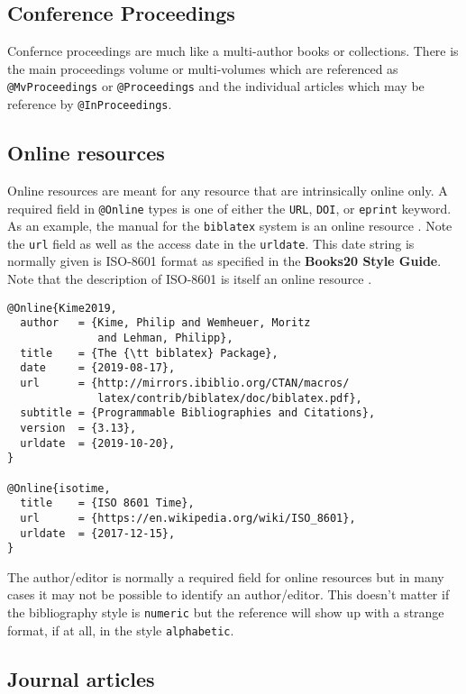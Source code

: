 \subsection{Conference Proceedings}

Confernce proceedings are much like a multi-author books or
collections.  There is the main proceedings volume or multi-volumes
which are referenced as \texttt{@MvProceedings} or
\texttt{@Proceedings} and the individual articles which may be
reference by \texttt{@InProceedings}.

\subsection{Online resources}

Online resources are meant for any resource that are intrinsically
online only.  A required field in \texttt{@Online} types is one of
either the \texttt{URL}, \texttt{DOI}, or \texttt{eprint}
keyword. As an example, the manual for the \texttt{biblatex} system
is an online resource \cite{Kime2019}. Note the \texttt{url} field
as well as the access date in the \texttt{urldate}. This date
string is normally given is ISO-8601 format as specified in the
{\bfseries Books20 Style Guide}. Note that the description of ISO-8601
is itself an online resource \cite{isotime}.

\begin{verbatim}
@Online{Kime2019,
  author   = {Kime, Philip and Wemheuer, Moritz
              and Lehman, Philipp},
  title    = {The {\tt biblatex} Package},
  date     = {2019-08-17},
  url      = {http://mirrors.ibiblio.org/CTAN/macros/
              latex/contrib/biblatex/doc/biblatex.pdf},
  subtitle = {Programmable Bibliographies and Citations},
  version  = {3.13},
  urldate  = {2019-10-20},
}

@Online{isotime,
  title    = {ISO 8601 Time},
  url      = {https://en.wikipedia.org/wiki/ISO_8601},
  urldate  = {2017-12-15},
}
\end{verbatim}

The author/editor is normally a required field for online resources
but in many cases it may not be possible to identify an
author/editor. This doesn't matter if the bibliography style is
\texttt{numeric} but the reference will show up with a strange
format, if at all, in the style \texttt{alphabetic}.

\subsection{Journal articles}

